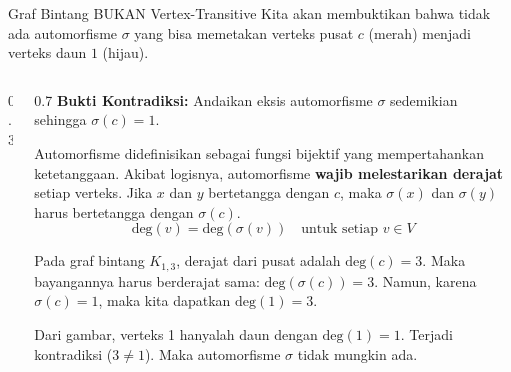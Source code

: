 \documentclass[aspectratio=169]{beamer}
\begin{document}
\begin{frame}[fragile]{Graf Bintang BUKAN Vertex-Transitive}
  Kita akan membuktikan bahwa tidak ada automorfisme $\sigma$ yang bisa memetakan verteks pusat $c$ (merah) menjadi verteks daun $1$ (hijau).

  \begin{columns}
    \begin{column}{0.3\textwidth}
    \end{column}

    \begin{column}{0.7\textwidth}
      \small
      \textbf{Bukti Kontradiksi:}
      Andaikan eksis automorfisme $\sigma$ sedemikian sehingga $\sigma(c) = 1$.

      Automorfisme didefinisikan sebagai fungsi bijektif yang mempertahankan ketetanggaan. Akibat logisnya, automorfisme \textbf{wajib melestarikan derajat} setiap verteks.
      Jika $x$ dan $y$ bertetangga dengan $c$, maka $\sigma(x)$ dan $\sigma(y)$ harus bertetangga dengan $\sigma(c)$.
      $$ \text{deg}(v) = \text{deg}(\sigma(v)) \quad \text{untuk setiap } v \in V $$

      \vspace{0.2cm}
      Pada graf bintang $K_{1,3}$, derajat dari pusat adalah $\text{deg}(c) = 3$.
      Maka bayangannya harus berderajat sama: $\text{deg}(\sigma(c)) = 3$.
      Namun, karena $\sigma(c) = 1$, maka kita dapatkan $\text{deg}(1) = 3$.

      \vspace{0.2cm}
      Dari gambar, verteks 1 hanyalah daun dengan $\text{deg}(1) = 1$.
      Terjadi kontradiksi ($3 \neq 1$). Maka automorfisme $\sigma$ tidak mungkin ada.
    \end{column}
  \end{columns}
\end{frame}
\end{document}
